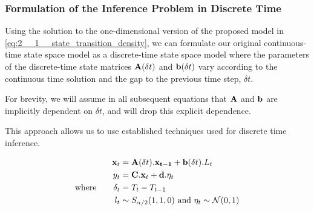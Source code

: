 \documentclass[../main.tex]{subfiles}
\begin{document}
\subsubsection{Formulation of the Inference Problem in Discrete Time}

Using the solution to the one-dimensional version of the proposed model in \autoref{eq:2__1__state_transition_density}, we can formulate our original continuous-time state space model as a discrete-time state space model where the parameters of the discrete-time state matrices ${\bf A}(\delta t)$ and ${\bf b}(\delta t)$ vary according to the continuous time solution and the gap to the previous time step, $\delta t$. 

For brevity, we will assume in all subsequent equations that ${\bf A}$ and ${\bf b}$ are implicitly dependent on $\delta t$, and will drop this explicit dependence. 

This approach allows us to use established techniques used for discrete time inference. 

\begin{align}
    \mathbf{x}_t & = \mathbf{A}(\delta t) . \mathbf{x_{t-1}} + \mathbf{b}( \delta t) . L_t \notag\\
    y_t & = \mathbf{C} . \mathbf{x}_t + \mathbf{d} . \mathbf{\eta}_t \\
    \text{where} \qquad \delta_t & = T_t - T_{t-1} \notag \\
    l_t & \sim S_{\alpha/2}(1,1,0) \text{  and  } \eta_t \sim \mathcal{N}(0,1) \notag
\end{align}


\printbibliography
\end{document}
